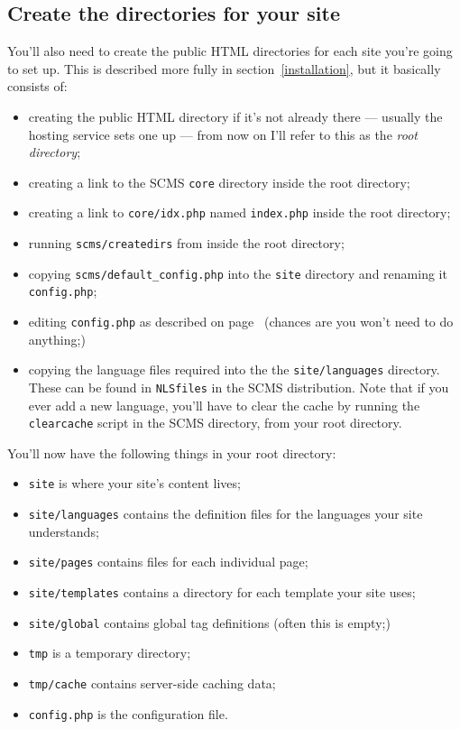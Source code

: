 \subsection{Create the directories for your site}
You'll also need to create the public HTML directories for each site you're
going to set up. This is described more fully in section~\ref{installation},
but it basically consists of:
\begin{itemize}
\item creating the public HTML directory if it's not already there --- 
usually the hosting service sets one up --- from now on I'll refer
to this as the \emph{root directory};
\item creating a link to the SCMS \texttt{core} directory inside the
root directory;
\item creating a link to \texttt{core/idx.php} named \texttt{index.php} 
inside the root directory;
\item running \texttt{scms/createdirs} from inside the root
directory;
\item copying \texttt{scms/default\_config.php} into the \texttt{site}
directory and renaming it \texttt{config.php};
\item editing \texttt{config.php} as described on page~\pageref{modiconfig}
(chances are you won't need to do anything;)
\item copying the language files required into the the \texttt{site/languages}
directory. These can be 
found in \texttt{NLSfiles} in the SCMS distribution.
Note that if you ever add a new language, you'll have to clear the cache
by running the \texttt{clearcache} script in the SCMS directory, from your
root directory.
\end{itemize}
You'll now have the following things in your root directory:
\begin{itemize}
\item \texttt{site} is where your site's content lives;
\item \texttt{site/languages} contains the definition files for the languages
your site understands;
\item \texttt{site/pages} contains files for each individual page;
\item \texttt{site/templates} contains a directory for each template your site uses;
\item \texttt{site/global} contains global tag definitions (often this is empty;)
\item \texttt{tmp} is a temporary directory;
\item \texttt{tmp/cache} contains server-side caching data;
\item \texttt{config.php} is the configuration file.
\end{itemize}

